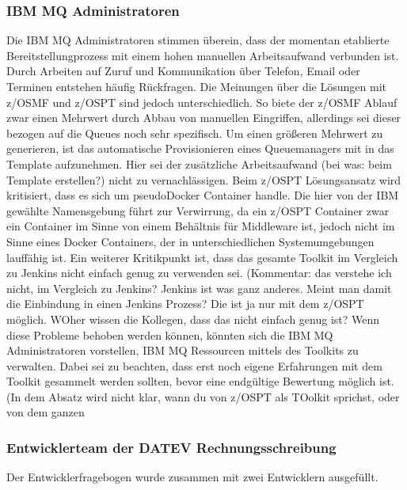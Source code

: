 \subsubsection{IBM MQ Administratoren}
Die IBM MQ Administratoren stimmen überein, dass der momentan etablierte Bereitstellungprozess mit einem hohen manuellen Arbeitsaufwand verbunden ist.
Durch Arbeiten auf Zuruf und Kommunikation über Telefon, Email oder Terminen entstehen häufig Rückfragen.
Die Meinungen über die Lösungen mit z/OSMF und z/OSPT sind jedoch unterschiedlich.
So biete der z/OSMF Ablauf zwar einen Mehrwert durch Abbau von manuellen Eingriffen, allerdings sei dieser bezogen auf die Queues noch sehr spezifisch.
Um einen größeren Mehrwert zu generieren, ist das automatische Provisionieren eines Queuemanagers mit in das Template aufzunehmen.
Hier sei der zusätzliche Arbeitsaufwand (bei was: beim Template erstellen?) nicht zu vernachlässigen.
Beim z/OSPT Lösungsansatz wird kritisiert, dass es sich  um \glqq pseudo\grqq Docker Container handle.
Die hier von der IBM gewählte Namensgebung führt zur Verwirrung, da ein z/OSPT Container zwar ein Container im Sinne von einem Behältnis für Middleware ist, jedoch nicht im Sinne eines Docker Containers, der in unterschiedlichen Systemumgebungen lauffähig ist.
Ein weiterer Kritikpunkt ist, dass das gesamte Toolkit im Vergleich zu Jenkins nicht einfach genug zu verwenden sei. (Kommentar: das verstehe ich nicht, im Vergleich zu Jenkins? Jenkins ist was ganz anderes. Meint man damit die Einbindung in einen Jenkins Prozess? Die ist ja nur mit dem z/OSPT möglich. WOher wissen die Kollegen, dass das nicht einfach genug ist? 
Wenn diese Probleme behoben werden können, könnten sich die IBM MQ Administratoren vorstellen, IBM MQ Ressourcen mittels des Toolkits zu verwalten.
Dabei sei zu beachten, dass erst noch eigene Erfahrungen mit dem Toolkit gesammelt werden sollten, bevor eine endgültige Bewertung möglich ist. (In dem Absatz wird nicht klar, wann du von z/OSPT als TOolkit sprichst, oder von dem ganzen 

\subsubsection{Entwicklerteam der DATEV Rechnungsschreibung}
Der Entwicklerfragebogen wurde zusammen mit zwei Entwicklern ausgefüllt.

